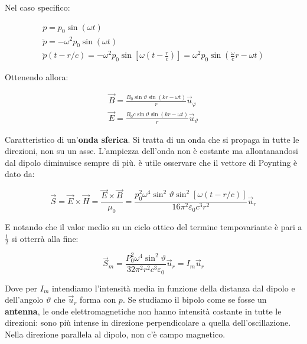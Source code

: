 Nel caso specifico:

\begin{gather*}
	p=p_0\sin (\omega t)\\
	\ddot{p} = - \omega^2 p_0\sin (\omega t)\\
	\ddot{p} (t-r/c) = -\omega^2 p_0\sin \left[ \omega\left( t-\frac{r}{c} \right)   \right] = \omega^2 p_0\sin \left( \frac{\omega}{c}r-\omega t \right)
\end{gather*}

Ottenendo allora:

\begin{gather*}
	\vec{B} = \frac{B_0\sin \vartheta \sin (kr-\omega t)}{r}\vec{u}_{\varphi}\\
	\vec{E} = \frac{B_0c\sin \vartheta \sin (kr-\omega t)}{r}\vec{u}_\vartheta
\end{gather*}

Caratteristico di un'\textbf{onda sferica}. Si tratta di un onda che si propaga in tutte le direzioni, non su un asse. L'ampiezza dell'onda non è costante ma allontanandosi dal dipolo diminuisce sempre di più.
è utile osservare che il vettore di Poynting è dato da:

\[
	\vec{S} =\vec{E} \times \vec{H} = \frac{\vec{E} \times \vec{B}}{\mu_0} = \frac{p_0^2 \omega^4 \sin^2 \vartheta \sin^2 [\omega(t-r/c)]}{16\pi^2 \varepsilon_0 c^3  r^2} \vec{u}_r
\]

E notando che il valor medio su un ciclo ottico del termine tempovariante è pari a $\frac{1}{2} $ si otterrà alla fine:

\[
	\vec{S}_m = \frac{P_0^2 \omega^4 \sin^2 \vartheta}{32\pi^2 r^2 c^3 \varepsilon_0} \vec{u}_r = I_m\vec{u}_r
\]

Dove per $I_m $ intendiamo l'intensità media in funzione della distanza dal dipolo e dell'angolo $\vartheta $ che $ \vec{u}_r $ forma con $p$.
Se studiamo il bipolo come se fosse un \textbf{antenna}, le onde elettromagnetiche non hanno intensità costante in tutte le direzioni: sono più intense in direzione perpendicolare a quella dell'oscillazione. Nella direzione parallela al dipolo, non c'è campo magnetico.

